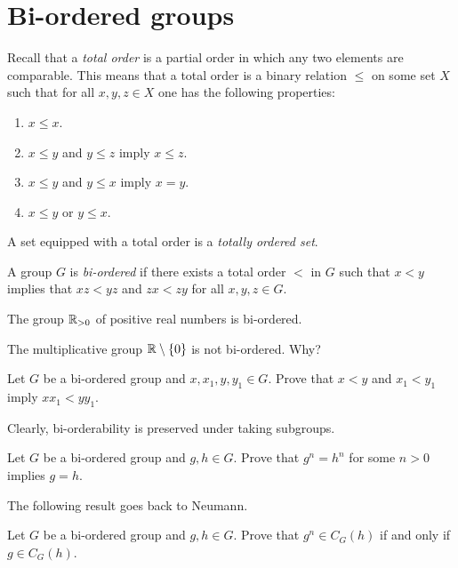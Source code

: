 \section{Bi-ordered groups}


Recall that a \emph{total order} is a partial order in which any two elements are comparable. This
means that a total order is a binary relation $\leq$ on some set $X$ 
such that for all $x,y,z\in X$ one has 
the following properties: 
\begin{enumerate}
    \item $x\leq x$.
    \item $x\leq y$ and $y\leq z$ imply $x\leq z$.
    \item $x\leq y$ and $y\leq x$ imply $x=y$.
    \item $x\leq y$ or $y\leq x$. 
\end{enumerate}
A set equipped with a total order is a \emph{totally ordered set}. 

\begin{definition}
	A group $G$ is \emph{bi-ordered} if there exists a total order 
	$<$ in $G$
	such that $x<y$ implies that $xz<yz$ and $zx<zy$ for all $x,y,z\in G$.
\end{definition}

\begin{example}
	The group $\mathbb{R}_{>0}$ of positive real numbers is bi-ordered. 
\end{example}

The multiplicative group $\mathbb{R}\setminus\{0\}$ is not bi-ordered. Why?

\begin{exercise}
	Let $G$ be a bi-ordered group and $x,x_1,y,y_1\in G$. Prove that
	$x<y$ and $x_1<y_1$ imply $xx_1<yy_1$.
\end{exercise}

Clearly, bi-orderability is preserved under taking subgroups. 

\begin{exercise}
	Let $G$ be a bi-ordered group and $g,h\in G$. Prove that $g^n=h^n$
	for some $n>0$ implies $g=h$.
\end{exercise}

The following result goes back to Neumann.

\begin{exercise}
    Let $G$ be a bi-ordered group and $g,h\in G$. Prove that $g^n\in C_G(h)$ if 
    and only if $g\in C_G(h)$.
\end{exercise}

